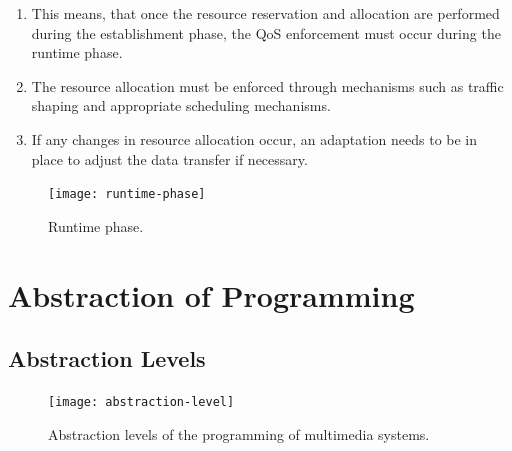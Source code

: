 \begin{multicols}{2}
	\begin{enumerate}
		\item This means, that once the resource reservation and allocation are performed during the establishment phase, the QoS enforcement must occur during the runtime phase. 
		\item The resource allocation must be enforced through mechanisms such as traffic shaping and appropriate scheduling mechanisms. 
		\item If any changes in resource allocation occur, an adaptation needs to be in place to adjust the data transfer if necessary.
	\end{enumerate}
\end{multicols}


\begin{figure}[tph]
	\centering
	\texttt{[image: runtime-phase]}
	\caption{Runtime phase.}
	\label{fig:runtime-phase}
\end{figure}






\section{Abstraction of Programming}
\subsection{Abstraction Levels}

\begin{figure}[ht!]
	\centering
	\texttt{[image: abstraction-level]}
	\caption{Abstraction levels of the programming of multimedia systems.}\label{fig:abstraction-level}
\end{figure}



